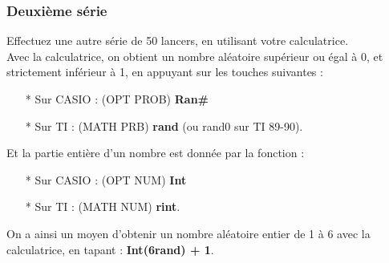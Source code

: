 \begin{center}


\end{center}

\newpage

\subsubsection*{Deuxième série}

Effectuez une autre série de 50 lancers, en utilisant votre calculatrice. \\

Avec la calculatrice, on obtient un nombre aléatoire supérieur ou égal à 0, et strictement inférieur à 1, en appuyant sur les touches suivantes : 

\begin{itemize}
\item[*] Sur CASIO : (OPT PROB) \textbf{Ran\#}
\item[*] Sur TI : (MATH PRB) \textbf{rand} (ou rand0 sur TI 89-90).
\end{itemize}

\vspace*{.3cm}

Et la partie entière d'un nombre est donnée par la fonction :

\begin{itemize}
\item[*] Sur CASIO : (OPT NUM) \textbf{Int}
\item[*] Sur TI : (MATH NUM) \textbf{rint}.
\end{itemize}

\vspace*{.3cm}

On a ainsi un moyen d'obtenir un nombre aléatoire entier de 1 à 6 avec la calculatrice, en tapant : \textbf{Int(6rand) + 1}. \\

